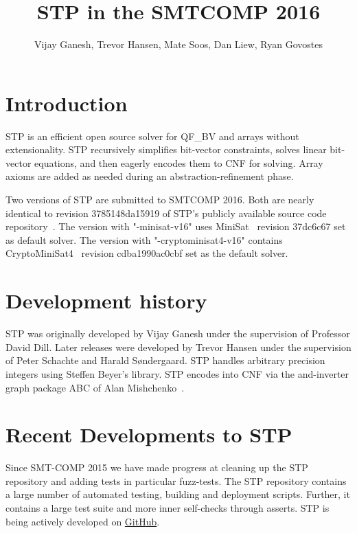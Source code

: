 \documentclass{llncs}
\begin{document}
\title{STP in the SMTCOMP 2016}
\author{Vijay Ganesh, Trevor Hansen, Mate Soos, Dan Liew, Ryan Govostes}
\institute{}

\maketitle
\thispagestyle{empty}
\pagestyle{empty}

\section{Introduction}
STP\cite{Vijay:Thesis:2007} is an efficient open source solver for QF\_BV and arrays without extensionality. STP recursively simplifies bit-vector constraints, solves linear bit-vector equations, and then eagerly encodes them to CNF for solving. Array axioms are added as needed during an abstraction-refinement phase.

Two versions of STP are submitted to SMTCOMP 2016. Both are nearly identical to revision 3785148da15919 of STP's publicly available source code repository~\cite{STP:github}. The version with "-minisat-v16" uses MiniSat~\cite{MiniSat:github} revision 37dc6c67 set as default solver. The version with "-cryptominisat4-v16" contains CryptoMiniSat4~\cite{CMS:github} revision cdba1990ac0cbf set as the default solver.

\section{Development history}
STP was originally developed by Vijay Ganesh under the supervision of Professor David Dill. Later releases were developed by Trevor Hansen under the supervision of Peter Schachte and Harald Søndergaard. STP handles arbitrary precision integers using Steffen Beyer's library. STP encodes into CNF via the and-inverter graph package ABC of Alan Mishchenko~\cite{Brayton:2010:AAI:2144310.2144317}.

\section{Recent Developments to STP}
Since SMT-COMP 2015 we have made progress at cleaning up the STP repository and adding tests in particular fuzz-tests. The STP repository contains a large number of automated testing, building and deployment scripts. Further, it contains a large test suite and more inner self-checks through asserts. STP is being actively developed on \href{https://github.com/stp/stp}{GitHub}.
\end{document}
